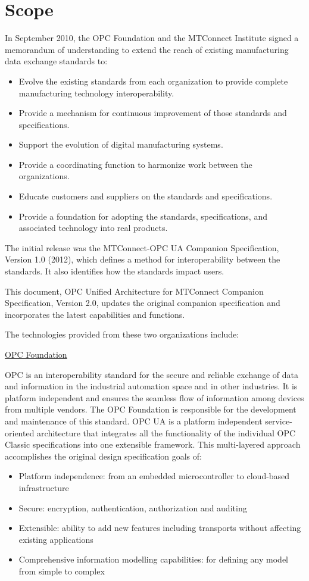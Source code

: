 \section{Scope}\label{scope}

In September 2010, the OPC Foundation and the MTConnect Institute signed a memorandum of understanding to extend the reach of existing manufacturing data exchange standards to:

\begin{itemize}
    \item Evolve the existing standards from each organization to provide complete manufacturing technology interoperability.
    \item Provide a mechanism for continuous improvement of those standards and specifications.
    \item Support the evolution of digital manufacturing systems.  
    \item Provide a coordinating function to harmonize work between the organizations.
    \item Educate customers and suppliers on the standards and specifications.
    \item Provide a foundation for adopting the standards, specifications, and associated technology into real products.
\end{itemize}

The initial release was the MTConnect-OPC UA Companion Specification, Version 1.0 (2012), which defines a method for interoperability between the standards. It also identifies how the standards impact users.

This document, OPC Unified Architecture for MTConnect Companion Specification, Version 2.0, updates the original companion specification and incorporates the latest capabilities and functions.   

The technologies provided from these two organizations include:

\quad\underline{OPC Foundation}

OPC is an interoperability standard for the secure and reliable exchange of data and information in the industrial automation space and in other industries.  It is platform independent and ensures the seamless flow of information among devices from multiple vendors. The OPC Foundation is responsible for the development and maintenance of this standard.
OPC UA is a platform independent service-oriented architecture that integrates all the functionality of the individual OPC Classic specifications into one extensible framework. This multi-layered approach accomplishes the original design specification goals of:
\begin{itemize}
    \item Platform independence: from an embedded microcontroller to cloud-based infrastructure
    \item Secure: encryption, authentication, authorization and auditing
    \item Extensible: ability to add new features including transports without affecting existing applications
    \item Comprehensive information modelling capabilities: for defining any model from simple to complex 
\end{itemize} 

